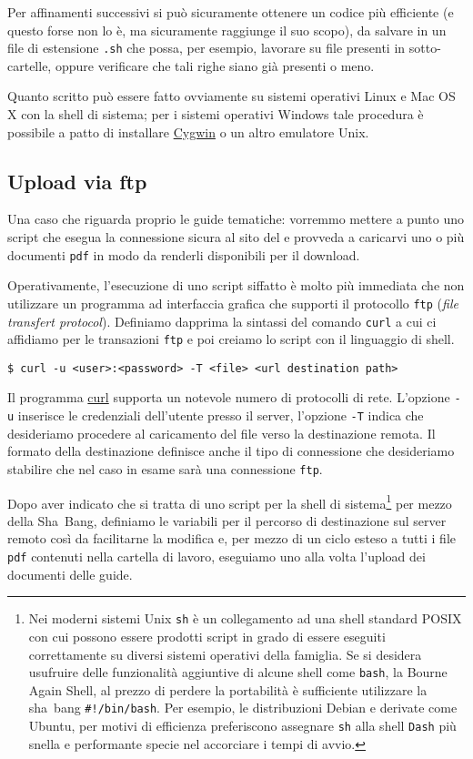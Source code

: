 Per affinamenti successivi si può sicuramente ottenere un codice più efficiente
(e questo forse non lo è, ma sicuramente raggiunge il suo scopo), da salvare in
un file di estensione \texttt{.sh} che possa, per esempio, lavorare su file
presenti in sotto-cartelle, oppure verificare che tali righe siano già presenti
o meno.

Quanto scritto può essere fatto ovviamente su sistemi operativi Linux e Mac OS
X con la shell di sistema; per i sistemi operativi Windows tale procedura è
possibile a patto di installare \href{http://www.cygwin.com/}{Cygwin} o un
altro emulatore Unix.

\subsection{Upload via ftp}

Una caso che riguarda proprio le guide tematiche: vorremmo mettere a punto uno
script che esegua la connessione sicura al sito del \GuIT*{} e provveda a
caricarvi uno o più documenti \texttt{pdf} in modo da renderli disponibili per
il download.

Operativamente, l'esecuzione di uno script siffatto è molto più immediata che
non utilizzare un programma ad interfaccia grafica che supporti il protocollo
\texttt{ftp} (\emph{file transfert protocol}). Definiamo dapprima la sintassi
del comando \texttt{curl} a cui ci affidiamo per le transazioni \texttt{ftp} e
poi creiamo lo script con il linguaggio di shell.
\begin{Verbatim}
$ curl -u <user>:<password> -T <file> <url destination path>
\end{Verbatim}

Il programma \href{http://curl.haxx.se/}{curl} supporta un notevole numero di
protocolli di rete. L'opzione \texttt{-u} inserisce le credenziali dell'utente
presso il server, l'opzione \texttt{-T} indica che desideriamo procedere al
caricamento del file verso la destinazione remota. Il formato della destinazione
definisce anche il tipo di connessione che desideriamo stabilire che nel caso in
esame sarà una connessione \texttt{ftp}.

Dopo aver indicato che si tratta di uno script per la shell di
sistema\footnote{Nei moderni sistemi Unix \texttt{sh} è un collegamento ad una
  shell standard POSIX con cui possono essere prodotti script in grado di essere
  eseguiti correttamente su diversi sistemi operativi della famiglia. Se si
  desidera usufruire delle funzionalità aggiuntive di alcune shell come
  \texttt{bash}, la Bourne Again Shell, al prezzo di perdere la portabilità è
  sufficiente utilizzare la sha~bang \texttt{\#!/bin/bash}.  Per esempio,
  le distribuzioni Debian e derivate come Ubuntu, per motivi di efficienza
  preferiscono assegnare \texttt{sh} alla shell \texttt{Dash} più snella e
  performante specie nel accorciare i tempi di avvio.} per mezzo della Sha~Bang,
definiamo le variabili per il percorso di destinazione sul server remoto così da
facilitarne la modifica e, per mezzo di un ciclo esteso a tutti i file
\texttt{pdf} contenuti nella cartella di lavoro, eseguiamo uno alla volta
l'upload dei documenti delle guide.

